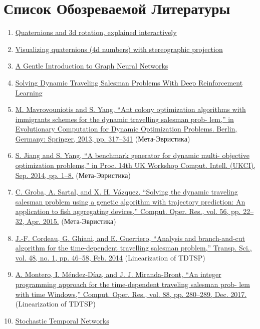 \section{Список Обозреваемой Литературы}
\begin{enumerate}
    \item \href{https://www.youtube.com/watch?v=zjMuIxRvygQ&pp=ygULcXVhdGVybmlvbnM%3D}{Quaternions and 3d rotation, explained interactively}
    \item \href{https://www.youtube.com/watch?v=d4EgbgTm0Bg&pp=ygULcXVhdGVybmlvbnM%3D}{Visualizing quaternions (4d numbers) with stereographic projection}
    \item \href{https://distill.pub/2021/gnn-intro/}{
    A Gentle Introduction to Graph Neural Networks
    }
    \item \href{https://pubmed.ncbi.nlm.nih.gov/34520362/}{
    Solving Dynamic Traveling Salesman Problems With Deep Reinforcement Learning 
    }
    \item \href{}{M. Mavrovouniotis and S. Yang, “Ant colony optimization algorithms
with immigrants schemes for the dynamic travelling salesman prob-
lem,” in Evolutionary Computation for Dynamic Optimization Problems.
Berlin, Germany: Springer, 2013, pp. 317–341} (Мета-Эвристика)
    \item \href{}{S. Jiang and S. Yang, “A benchmark generator for dynamic multi-
objective optimization problems,” in Proc. 14th UK Workshop Comput.
Intell. (UKCI), Sep. 2014, pp. 1–8.} (Мета-Эвристика)
    \item \href{}{ C. Groba, A. Sartal, and X. H. Vázquez, “Solving the dynamic traveling
salesman problem using a genetic algorithm with trajectory prediction:
An application to fish aggregating devices,” Comput. Oper. Res., vol. 56,
pp. 22–32, Apr. 2015.} (Мета-Эвристика)
    \item \href{}{J.-F. Cordeau, G. Ghiani, and E. Guerriero, “Analysis and branch-and-cut
algorithm for the time-dependent travelling salesman problem,” Transp.
Sci., vol. 48, no. 1, pp. 46–58, Feb. 2014} (Linearization of TDTSP)
    \item \href{}{A. Montero, I. Méndez-Díaz, and J. J. Miranda-Bront, “An integer
programming approach for the time-dependent traveling salesman prob-
lem with time Windows,” Comput. Oper. Res., vol. 88, pp. 280–289,
Dec. 2017.} (Linearization of TDTSP)
    \item \href{https://cnrrobertson.github.io/other/mlseminar/fall_2021/Stochastic%20Temporal%20Networks%20-%20Binan%20Gu.pdf}{Stochastic Temporal Networks}

\end{enumerate}
